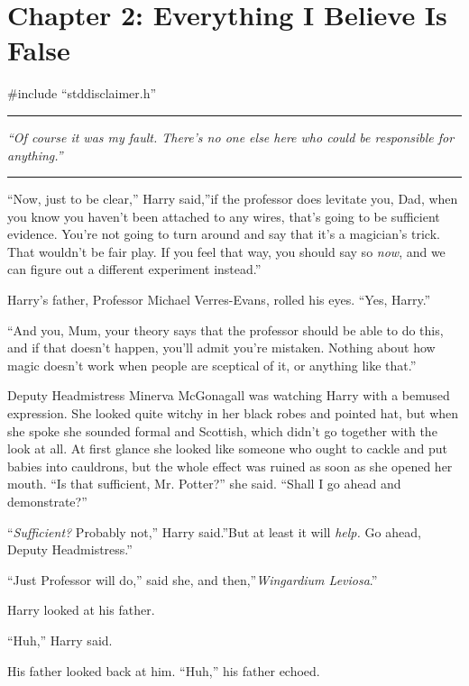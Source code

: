 \chapter{Chapter 2: Everything I Believe Is False}
\#include ``stddisclaimer.h''

\begin{center}\rule{3in}{0.4pt}\end{center}

\emph{``Of course it was my fault. There's no one else here who could be
responsible for anything.''}

\begin{center}\rule{3in}{0.4pt}\end{center}

``Now, just to be clear,'' Harry said,''if the professor does levitate
you, Dad, when you know you haven't been attached to any wires, that's
going to be sufficient evidence. You're not going to turn around and say
that it's a magician's trick. That wouldn't be fair play. If you feel
that way, you should say so \emph{now}, and we can figure out a
different experiment instead.''

Harry's father, Professor Michael Verres-Evans, rolled his eyes. ``Yes,
Harry.''

``And you, Mum, your theory says that the professor should be able to do
this, and if that doesn't happen, you'll admit you're mistaken. Nothing
about how magic doesn't work when people are sceptical of it, or
anything like that.''

Deputy Headmistress Minerva McGonagall was watching Harry with a bemused
expression. She looked quite witchy in her black robes and pointed hat,
but when she spoke she sounded formal and Scottish, which didn't go
together with the look at all. At first glance she looked like someone
who ought to cackle and put babies into cauldrons, but the whole effect
was ruined as soon as she opened her mouth. ``Is that sufficient, Mr.
Potter?'' she said. ``Shall I go ahead and demonstrate?''

``\emph{Sufficient?} Probably not,'' Harry said.''But at least it will
\emph{help.} Go ahead, Deputy Headmistress.''

``Just Professor will do,'' said she, and then,''\emph{Wingardium
Leviosa}.''

Harry looked at his father.

``Huh,'' Harry said.

His father looked back at him. ``Huh,'' his father echoed.

